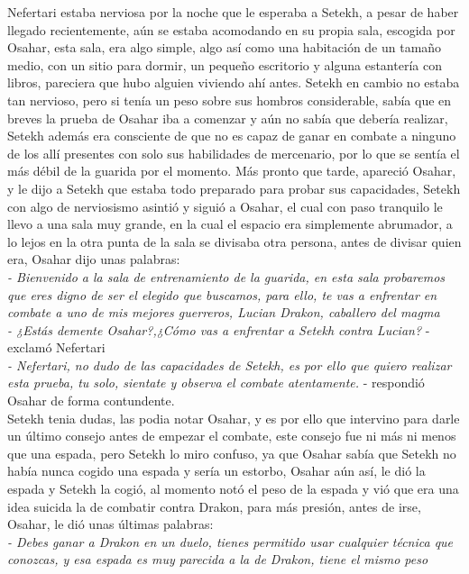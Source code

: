 Nefertari estaba nerviosa por la noche que le esperaba a Setekh, a pesar de haber llegado recientemente, aún se estaba acomodando en su propia sala,
escogida por Osahar, esta sala, era algo simple, algo así como una habitación de un tamaño medio, con un sitio para dormir, un pequeño escritorio y alguna estantería con libros, pareciera que hubo alguien viviendo ahí antes.
Setekh en cambio no estaba tan nervioso, pero si tenía un peso sobre sus hombros considerable, sabía que en breves la prueba de Osahar iba a comenzar y aún no sabía que debería realizar, Setekh además era consciente de que no es capaz de
ganar en combate a ninguno de los allí presentes con solo sus habilidades de mercenario, por lo que se sentía el más débil de la guarida por el momento. Más pronto que tarde, apareció Osahar, y le dijo a Setekh que estaba todo preparado para probar
sus capacidades, Setekh con algo de nerviosismo asintió y siguió a Osahar, el cual con paso tranquilo le llevo a una sala muy grande, en la cual el espacio era simplemente abrumador, a lo lejos en la otra punta de la sala se divisaba otra persona, antes de divisar quien era, Osahar dijo unas palabras:\\
\textit{- Bienvenido a la sala de entrenamiento de la guarida, en esta sala probaremos que eres digno de ser el elegido que buscamos, para ello, te vas a enfrentar en combate a uno de mis mejores guerreros, Lucian Drakon, caballero del magma}\\
\textit{- ¿Estás demente Osahar?,¿Cómo vas a enfrentar a Setekh contra Lucian?} - exclamó Nefertari\\
\textit{- Nefertari, no dudo de las capacidades de Setekh, es por ello que quiero realizar esta prueba, tu solo, sientate y observa el combate atentamente.} - respondió Osahar de forma contundente.\\
Setekh tenia dudas, las podia notar Osahar, y es por ello que intervino para darle un último consejo antes de empezar el combate, este consejo fue ni más ni menos que una espada, pero Setekh lo miro confuso, ya que Osahar sabía que Setekh no había nunca cogido una espada y sería un estorbo, Osahar aún así,
le dió la espada y Setekh la cogió, al momento notó el peso de la espada y vió que era una idea suicida la de combatir contra Drakon, para más presión, antes de irse, Osahar, le dió unas últimas palabras:\\
\textit{- Debes ganar a Drakon en un duelo, tienes permitido usar cualquier técnica que conozcas, y esa espada es muy parecida a la de Drakon, tiene el mismo peso}\\
